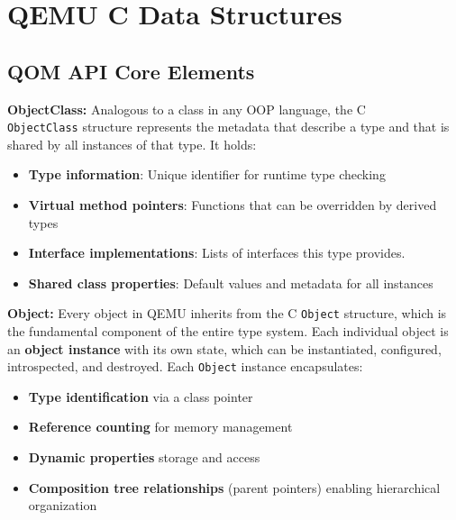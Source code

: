 \chapter{QEMU C Data Structures}
\label{ann:qemu_c_structures}

\section{QOM API Core Elements} 

\textbf{ObjectClass:} Analogous to a class in any OOP language, the C \\ 
\texttt{ObjectClass} structure represents the metadata that describe a type and that is 
shared by all instances of that type. It holds\cite{Qemu_QOM_API}:



\begin{itemize}
    \item \textbf{Type information}: Unique identifier for runtime type checking
    \item \textbf{Virtual method pointers}: Functions that can be overridden by derived types
    \item \textbf{Interface implementations}: Lists of interfaces this type provides.
    \item \textbf{Shared class properties}: Default values and metadata for all instances
\end{itemize}

\textbf{Object:} Every object in QEMU inherits from the C \texttt{Object} structure, which 
is the fundamental component of the entire type system. Each individual object 
is an \textbf{object instance} with its own state, which can be instantiated, configured, 
introspected, and destroyed. Each \texttt{Object} instance encapsulates:



\begin{itemize}
    \item \textbf{Type identification} via a class pointer
    \item \textbf{Reference counting} for memory management
    \item \textbf{Dynamic properties} storage and access
    \item \textbf{Composition tree relationships} (parent pointers) enabling hierarchical 
                                        organization
\end{itemize}

